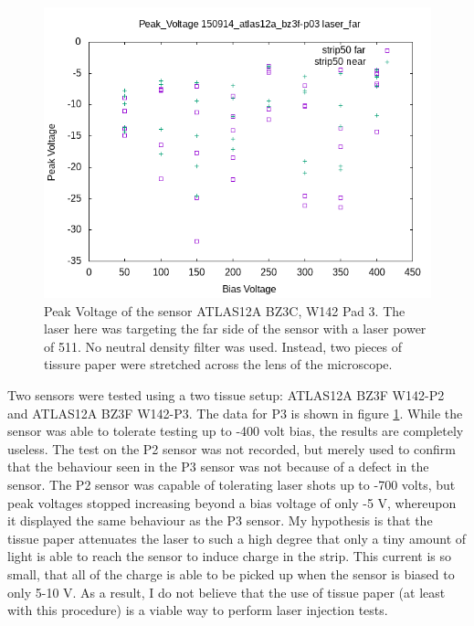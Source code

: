 \documentclass{report}
\begin{document}
            \begin{figure}[h] 
                \includegraphics[height=.4\textheight]{Peak_Voltage__150914_atlas12a_bz3f-p03__laser_far}
                \centering
                \caption{ Peak Voltage of the sensor ATLAS12A BZ3C, W142 Pad 3. The laser here was targeting the far side of the sensor with a laser power of 511. No neutral density filter was used. Instead, two pieces of tissure paper were stretched across the lens of the microscope. }
                \label{fig:Peak_Voltage__150914_atlas12a_bz3f-p03__laser_far}
            \end{figure}

            Two sensors were tested using a two tissue setup: ATLAS12A BZ3F W142-P2 and ATLAS12A BZ3F W142-P3. The data for P3 is shown in figure \ref{fig:Peak_Voltage__150914_atlas12a_bz3f-p03__laser_far}. While the sensor was able to tolerate testing up to -400 volt bias, the results are completely useless. The test on the P2 sensor was not recorded, but merely used to confirm that the behaviour seen in the P3 sensor was not because of a defect in the sensor. The P2 sensor was capable of tolerating laser shots up to -700 volts, but peak voltages stopped increasing beyond a bias voltage of only -5 V, whereupon it displayed the same behaviour as the P3 sensor. My hypothesis is that the tissue paper attenuates the laser to such a high degree that only a tiny amount of light is able to reach the sensor to induce charge in the strip. This current is so small, that all of the charge is able to be picked up when the sensor is biased to only 5-10 V. As a result, I do not believe that the use of tissue paper (at least with this procedure) is a viable way to perform laser injection tests.
\end{document}
